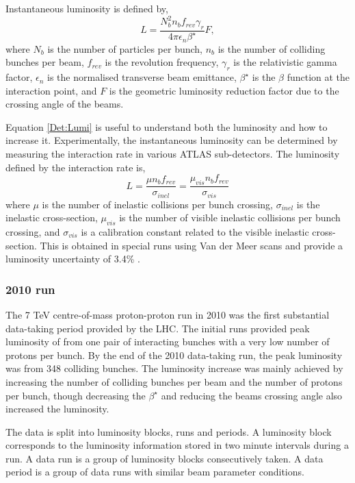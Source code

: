 Instantaneous luminosity is defined by,
\begin{equation}
L=\frac{N_b^2n_bf_{rev}\gamma_r}{4\pi\epsilon_n\beta^\star}F,
\label{Det:Lumi}
\end{equation}
where $N_b$ is the number of particles per bunch, $n_b$ is the number of colliding bunches per beam, $f_{rev}$ is the revolution frequency, $\gamma_r$ is the relativistic gamma factor, $\epsilon_n$ is the normalised transverse beam emittance, $\beta^\star$ is the $\beta$ function at the interaction point, and $F$ is the geometric luminosity reduction factor due to the crossing angle of the beams.


Equation \ref{Det:Lumi} is useful to understand both the luminosity and how to increase it. 
Experimentally, the instantaneous luminosity can be determined by measuring the interaction rate in various ATLAS sub-detectors.
The luminosity defined by the interaction rate is,
\begin{equation}
L=\frac{\mu n_bf_{rev}}{\sigma_{inel}}=\frac{\mu_{vis}n_bf_{rev}}{\sigma_{vis}}
\label{Det:Lumi2}
\end{equation}
where $\mu$ is the number of inelastic collisions per bunch crossing, $\sigma_{inel}$ is the inelastic cross-section, $\mu_{vis}$ is the number of visible inelastic collisions per bunch crossing, and $\sigma_{vis}$ is a calibration constant related to the visible inelastic cross-section. 
This is obtained in special runs using Van der Meer scans and provide a luminosity uncertainty of 3.4\% \cite{ref:Lumi}.

\subsubsection{2010 run}
The 7 TeV centre-of-mass proton-proton run in 2010 was the first substantial data-taking period provided by the LHC. 
The initial runs provided peak luminosity of  from one pair of interacting bunches with a very low number of protons per bunch. 
By the end of the 2010 data-taking run, the peak luminosity was  from 348 colliding bunches.
The luminosity increase was mainly achieved by increasing the number of colliding bunches per beam and the number of protons per bunch, though decreasing the $\beta^\star$ and reducing the beams crossing angle also increased the luminosity.

The data is split into luminosity blocks, runs and periods.
A luminosity block corresponds to the luminosity information stored in two minute intervals during a run. 
A data run is a group of luminosity blocks consecutively taken. 
A data period is a group of data runs with similar beam parameter conditions.

